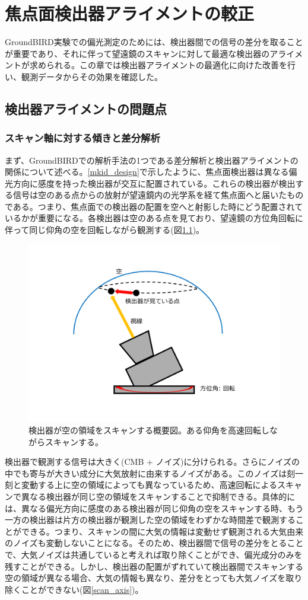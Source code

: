 \chapter{焦点面検出器アライメントの較正}
\label{chapter4}

GroundBIRD実験での偏光測定のためには、検出器間での信号の差分を取ることが重要であり、それに伴って望遠鏡のスキャンに対して最適な検出器のアライメントが求められる。この章では検出器アライメントの最適化に向けた改善を行い、観測データからその効果を確認した。

\section{検出器アライメントの問題点}

\subsection{スキャン軸に対する傾きと差分解析}
\label{scan_pair_diff}
まず、GroundBIRDでの解析手法の1つである差分解析と検出器アライメントの関係について述べる。\ref{mkid_design}で示したように、焦点面検出器は異なる偏光方向に感度を持った検出器が交互に配置されている。これらの検出器が検出する信号は空のある点からの放射が望遠鏡内の光学系を経て焦点面へと届いたものである。つまり、焦点面での検出器の配置を空へと射影した時にどう配置されているかが重要になる。各検出器は空のある点を見ており、望遠鏡の方位角回転に伴って同じ仰角の空を回転しながら観測する(図\ref{scan_image})。
\begin{figure}[htbp]
  \centering
  \includegraphics[width=0.6\columnwidth]{5_alignment/figs/scan_image.pdf}
  \caption{検出器が空の領域をスキャンする概要図。ある仰角を高速回転しながらスキャンする。}
  \label{scan_image}
\end{figure}
検出器で観測する信号は大きく(CMB + ノイズ)に分けられる。さらにノイズの中でも寄与が大きい成分に大気放射に由来するノイズがある。このノイズは刻一刻と変動する上に空の領域によっても異なっているため、高速回転によるスキャンで異なる検出器が同じ空の領域をスキャンすることで抑制できる。具体的には、異なる偏光方向に感度のある検出器が同じ仰角の空をスキャンする時、もう一方の検出器は片方の検出器が観測した空の領域をわずかな時間差で観測することができる。つまり、スキャンの間に大気の情報は変動せず観測される大気由来のノイズも変動しないことになる。そのため、検出器間で信号の差分をとることで、大気ノイズは共通していると考えれば取り除くことができ、偏光成分のみを残すことができる。しかし、検出器の配置がずれていて検出器間でスキャンする空の領域が異なる場合、大気の情報も異なり、差分をとっても大気ノイズを取り除くことができない(図\ref{scan_axis})。
